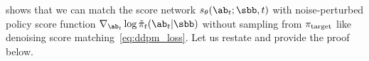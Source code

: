  shows that we can match the score network $s_\theta(\ab_t;\sbb, t)$ with noise-perturbed policy score function $\nabla_{\ab_t}\log \tilde\pi_t(\ab_t|\sbb)$ without sampling from $\pi_{\rm target}$ like denoising score matching~\eqref{eq:ddpm_loss}. Let us restate  and provide the proof below.

\rssm*

